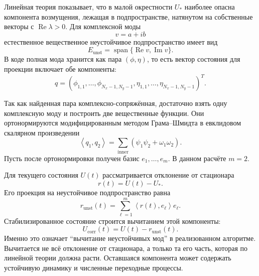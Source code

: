 \documentclass[12pt,a4paper]{article}
\newcommand{\inner}[2]{\left\langle #1,#2 \right\rangle}
\begin{document}
Линейная теория показывает, что в малой окрестности \(U_*\) наиболее опасна компонента возмущения, лежащая в подпространстве, натянутом на собственные векторы с \(\operatorname{Re}\lambda>0\).
Для комплексной моды
\[
    v=a+ib
\]
естественное вещественное неустойчивое подпространство имеет вид
\begin{equation}
    E_{\mathrm{unst}}
    =
    \operatorname{span}\{\operatorname{Re}v,\operatorname{Im}v\}.
    \label{eq:unstable-real-subspace}
\end{equation}
В коде полная мода хранится как пара \((\phi,\eta)\), то есть вектор состояния для проекции включает обе компоненты:
\begin{equation}
    q=
    \left(
    \phi_{1,1},\ldots,\phi_{N_x-1,N_y-1},
    \eta_{1,1},\ldots,\eta_{N_x-1,N_y-1}
    \right)^T.
    \label{eq:projection-state}
\end{equation}

Так как найденная пара комплексно-сопряжённая, достаточно взять одну комплексную моду и построить две вещественные функции.
Они ортонормируются модифицированным методом Грама--Шмидта в евклидовом скалярном произведении
\begin{equation}
    \inner{q_1}{q_2}
    =
    \sum_{\text{inner}}
    \left(
    \psi_1\psi_2+\omega_1\omega_2
    \right).
    \label{eq:projection-inner-product}
\end{equation}
Пусть после ортонормировки получен базис \(e_1,\ldots,e_m\).
В данном расчёте \(m=2\).

Для текущего состояния \(U(t)\) рассматривается отклонение от стационара
\begin{equation}
    r(t)=U(t)-U_*.
    \label{eq:state-deviation}
\end{equation}
Его проекция на неустойчивое подпространство равна
\begin{equation}
    r_{\mathrm{unst}}(t)
    =
    \sum_{\ell=1}^{m}
    \inner{r(t)}{e_\ell}e_\ell.
    \label{eq:unstable-projection}
\end{equation}
Стабилизированное состояние строится вычитанием этой компоненты:
\begin{equation}
    U_{\mathrm{corr}}(t)
    =
    U(t)-r_{\mathrm{unst}}(t).
    \label{eq:modal-subtraction}
\end{equation}
Именно это означает ``вычитание неустойчивых мод'' в реализованном алгоритме.
Вычитается не всё отклонение от стационара, а только та его часть, которая по линейной теории должна расти.
Оставшаяся компонента может содержать устойчивую динамику и численные переходные процессы.
\end{document}
